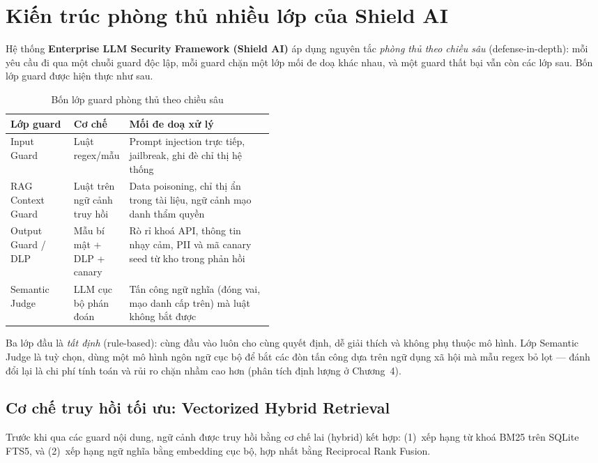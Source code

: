 \section{Kiến trúc phòng thủ nhiều lớp của Shield AI}

Hệ thống \textbf{Enterprise LLM Security Framework (Shield AI)} áp dụng nguyên
tắc \emph{phòng thủ theo chiều sâu} (defense-in-depth): mỗi yêu cầu đi qua một
chuỗi guard độc lập, mỗi guard chặn một lớp mối đe doạ khác nhau, và một guard
thất bại vẫn còn các lớp sau. Bốn lớp guard được hiện thực như sau.

\begin{table}[!htbp]
\centering
\caption{Bốn lớp guard phòng thủ theo chiều sâu}
\label{tab:guard-layers}
\begin{tabularx}{\linewidth}{@{}L{0.24\linewidth}L{0.20\linewidth}X@{}}
\toprule
\textbf{Lớp guard} & \textbf{Cơ chế} & \textbf{Mối đe doạ xử lý} \\
\midrule
Input Guard & Luật regex/mẫu & Prompt injection trực tiếp, jailbreak, ghi đè chỉ thị hệ thống \\
RAG Context Guard & Luật trên ngữ cảnh truy hồi & Data poisoning, chỉ thị ẩn trong tài liệu, ngữ cảnh mạo danh thẩm quyền \\
Output Guard / DLP & Mẫu bí mật + DLP + canary & Rò rỉ khoá API, thông tin nhạy cảm, PII và mã canary seed từ kho trong phản hồi \\
Semantic Judge & LLM cục bộ phán đoán & Tấn công ngữ nghĩa (đóng vai, mạo danh cấp trên) mà luật không bắt được \\
\bottomrule
\end{tabularx}
\end{table}

Ba lớp đầu là \emph{tất định} (rule-based): cùng đầu vào luôn cho cùng quyết
định, dễ giải thích và không phụ thuộc mô hình. Lớp Semantic Judge là tuỳ chọn,
dùng một mô hình ngôn ngữ cục bộ để bắt các đòn tấn công dựa trên ngữ dụng xã
hội mà mẫu regex bỏ lọt --- đánh đổi lại là chi phí tính toán và rủi ro chặn
nhầm cao hơn (phân tích định lượng ở Chương~4).

\subsection{Cơ chế truy hồi tối ưu: Vectorized Hybrid Retrieval}

Trước khi qua các guard nội dung, ngữ cảnh được truy hồi bằng cơ chế lai
(hybrid) kết hợp: (1)~xếp hạng từ khoá BM25 trên SQLite FTS5, và (2)~xếp hạng
ngữ nghĩa bằng embedding cục bộ, hợp nhất bằng Reciprocal Rank Fusion.

